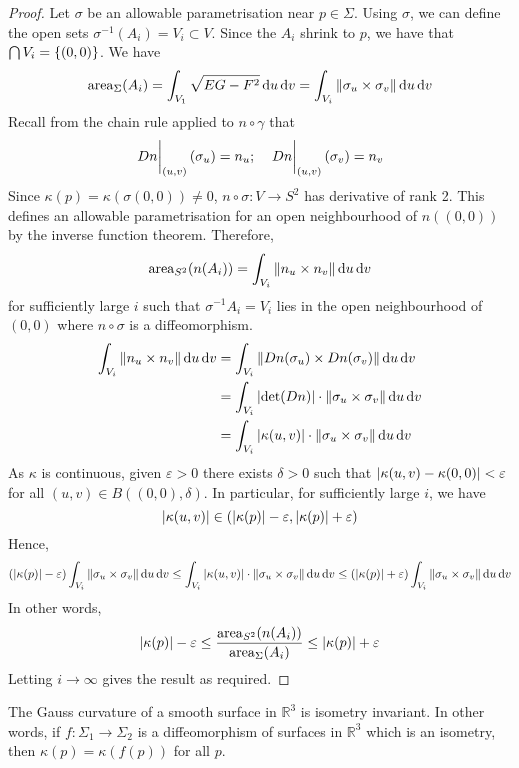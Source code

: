 \begin{proof}
	Let \( \sigma \) be an allowable parametrisation near \( p \in \Sigma \).
	Using \( \sigma \), we can define the open sets \( \sigma^{-1}(A_i) = V_i \subset V \).
	Since the \( A_i \) shrink to \( p \), we have that \( \bigcap V_i = \qty{(0,0)} \).
	We have
	\[
		\mathrm{area}_\Sigma(A_i) = \int_{V_1} \sqrt{EG - F^2} \dd{u} \dd{v} = \int_{V_i} \norm{\sigma_u \times \sigma_v} \dd{u}\dd{v}
	\]
	Recall from the chain rule applied to \( n \circ \gamma \) that
	\[
		\eval{Dn}_{(u,v)}(\sigma_u) = n_u;\quad \eval{Dn}_{(u,v)}(\sigma_v) = n_v
	\]
	Since \( \kappa(p) = \kappa(\sigma(0,0)) \neq 0 \), \( n \circ \sigma \colon V \to S^2 \) has derivative of rank 2.
	This defines an allowable parametrisation for an open neighbourhood of \( n((0,0)) \) by the inverse function theorem.
	Therefore,
	\[
		\mathrm{area}_{S^2}(n(A_i)) = \int_{V_i} \norm{n_u \times n_v} \dd{u} \dd{v}
	\]
	for sufficiently large \( i \) such that \( \sigma^{-1} A_i = V_i \) lies in the open neighbourhood of \( (0,0) \) where \( n \circ \sigma \) is a diffeomorphism.
	\begin{align*}
		\int_{V_i} \norm{n_u \times n_v} \dd{u} \dd{v} & = \int_{V_i} \norm{Dn(\sigma_u) \times Dn(\sigma_v)} \dd{u} \dd{v}                \\
		                                               & = \int_{V_i} \abs{\det (Dn)} \cdot \norm{\sigma_u \times \sigma_v} \dd{u} \dd{v}  \\
		                                               & = \int_{V_i} \abs{\kappa(u,v)} \cdot \norm{\sigma_u \times \sigma_v} \dd{u}\dd{v}
	\end{align*}
	As \( \kappa \) is continuous, given \( \varepsilon > 0 \) there exists \( \delta > 0 \) such that \( \abs{\kappa(u,v) - \kappa(0,0)} < \varepsilon \) for all \( (u,v) \in B((0,0), \delta) \).
	In particular, for sufficiently large \( i \), we have
	\[
		\abs{\kappa(u,v)} \in \qty(\abs{\kappa(p)}-\varepsilon, \abs{\kappa(p)}+\varepsilon)
	\]
	Hence,
	\[
		\qty(\abs{\kappa(p)}-\varepsilon) \int_{V_i} \norm{\sigma_u \times \sigma_v} \dd{u}\dd{v} \leq \int_{V_i} \abs{\kappa(u,v)} \cdot \norm{\sigma_u \times \sigma_v} \dd{u}\dd{v} \leq \qty(\abs{\kappa(p)}+\varepsilon) \int_{V_i} \norm{\sigma_u \times \sigma_v} \dd{u}\dd{v}
	\]
	In other words,
	\[
		\abs{\kappa(p)}-\varepsilon \leq \frac{\mathrm{area}_{S^2} (n(A_i))}{\mathrm{area}_{\Sigma} (A_i)} \leq \abs{\kappa(p)} + \varepsilon
	\]
	Letting \( i \to \infty \) gives the result as required.
\end{proof}
\begin{theorem}
	The Gauss curvature of a smooth surface in \( \mathbb R^3 \) is isometry invariant.
	In other words, if \( f \colon \Sigma_1 \to \Sigma_2 \) is a diffeomorphism of surfaces in \( \mathbb R^3 \) which is an isometry, then \( \kappa(p) = \kappa(f(p)) \) for all \( p \).
\end{theorem}
